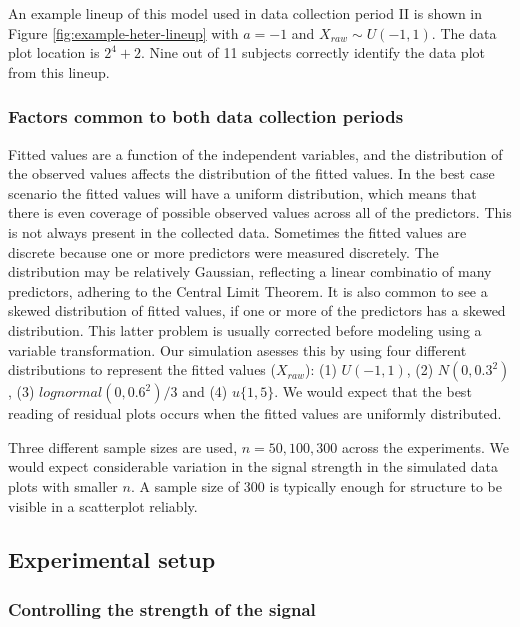 \documentclass[]{interact}
\theoremstyle{plain}%
\theoremstyle{definition}
\theoremstyle{remark}
\begin{document}
An example lineup of this model used in data collection period II is
shown in Figure \ref{fig:example-heter-lineup} with \(a = -1\) and
\(X_{raw} \sim U(-1, 1)\). The data plot location is \(2^4 + 2\). Nine
out of 11 subjects correctly identify the data plot from this lineup.

\hypertarget{factors-common-to-both-data-collection-periods}{%
\subsubsection{Factors common to both data collection
periods}\label{factors-common-to-both-data-collection-periods}}

Fitted values are a function of the independent variables, and the
distribution of the observed values affects the distribution of the
fitted values. In the best case scenario the fitted values will have a
uniform distribution, which means that there is even coverage of
possible observed values across all of the predictors. This is not
always present in the collected data. Sometimes the fitted values are
discrete because one or more predictors were measured discretely. The
distribution may be relatively Gaussian, reflecting a linear combinatio
of many predictors, adhering to the Central Limit Theorem. It is also
common to see a skewed distribution of fitted values, if one or more of
the predictors has a skewed distribution. This latter problem is usually
corrected before modeling using a variable transformation. Our
simulation asesses this by using four different distributions to
represent the fitted values (\(X_{raw}\)): (1) \(U(-1, 1)\), (2)
\(N(0, 0.3^2)\), (3) \(lognormal(0, 0.6^2)/3\) and (4) \(u\{1, 5\}\). We
would expect that the best reading of residual plots occurs when the
fitted values are uniformly distributed.

Three different sample sizes are used, \(n=50, 100, 300\) across the
experiments. We would expect considerable variation in the signal
strength in the simulated data plots with smaller \(n\). A sample size
of 300 is typically enough for structure to be visible in a scatterplot
reliably.

\hypertarget{experimental-setup}{%
\subsection{Experimental setup}\label{experimental-setup}}

\hypertarget{controlling-the-strength-of-the-signal}{%
\subsubsection{Controlling the strength of the
signal}\label{controlling-the-strength-of-the-signal}}
\end{document}
